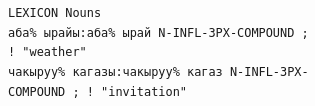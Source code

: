 \documentclass[a0paper,fontscale=0.3]{baposter}  %
\begin{document}
\begin{poster}
{{{			\texttt{LEXICON Nouns\\
			\vspace{-0.5ex}аба\%\ ырайы:аба\%\ ырай\ N-INFL-3PX-COMPOUND ;\\\vspace{-0.5ex}\hspace{0.1pt}\hfill{}!\ "weather"\\
			\vspace{-0.5ex}чакыруу\%\ кагазы:чакыруу\%\ кагаз\ N-INFL-3PX-\\\vspace{-0.5ex}\hspace{0.1pt}\hfill{}COMPOUND ;\ !\ "invitation"}}
			}
				
			\vspace{0.5ex}
		}

					\renewcommand{\arraystretch}{0.65}
%
%
%


\end{poster}
\end{document}
